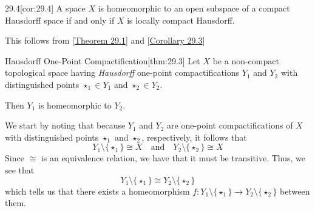 \begin{thmBox}[Corollary]{29.4}[cor:29.4]
    A space \( X \) is homeomorphic to an open subspace of a compact Hausdorff 
    space if and only if \( X \) is locally compact Hausdorff.

    \baseRule

    \begin{proofBox}
        This follows from [\hyperlink{thm:29.1}{Theorem 29.1}] and 
        [\hyperlink{cor:29.3}{Corollary 29.3}]
    \end{proofBox}
\end{thmBox}

\begin{thmBox}{Hausdorff One-Point Compactification}[thm:29.3]
    Let \( X \) be a non-compact topological space having \textit{Hausdorff}
    one-point compactifications \( Y_{ 1 } \) and \( Y_{ 2 } \) with 
    distinguished points \( \star_{ 1 } \in Y_{ 1 } \) and \( \star_{ 2 } \in
    Y_{ 2 } \).

    \baseSkip

    Then \( Y_{ 1 } \) is homeomorphic to \( Y_{ 2 } \).

    \baseRule

    \begin{proofBox}
        We start by noting that because \( Y_{ 1 } \) and \( Y_{ 2 } \) are 
        one-point compactifications of \( X \) with distinguished points 
        \( \star_{ 1 } \) and \( \star_{ 2 } \), respectively, it follows that
        \begin{equation*}
            Y_{ 1 } \setminus \{ \star_{ 1 } \} 
            \cong 
            X
            \quad \mathrm{and} \quad 
            Y_{ 2 } \setminus \{ \star_{ 2 } \} 
            \cong 
            X
        \end{equation*}
        Since \( \cong \) is an equivalence relation, we have that it must be 
        transitive. 
        Thus, we see that 
        \begin{equation*}
            Y_{ 1 } \setminus \{ \star_{ 1 } \}
            \cong 
            Y_{ 2 } \setminus \{ \star_{ 2 } \}
        \end{equation*}
        which tells us that there exists a homeomorphism 
        \( 
            f: Y_{ 1 } \setminus \{ \star_{ 1 } \} \rightarrow 
            Y_{ 2 } \setminus \{ \star_{ 2 } \} 
        \)
        between them.

        \baseSkip


\end{proofBox}
\end{thmBox}
